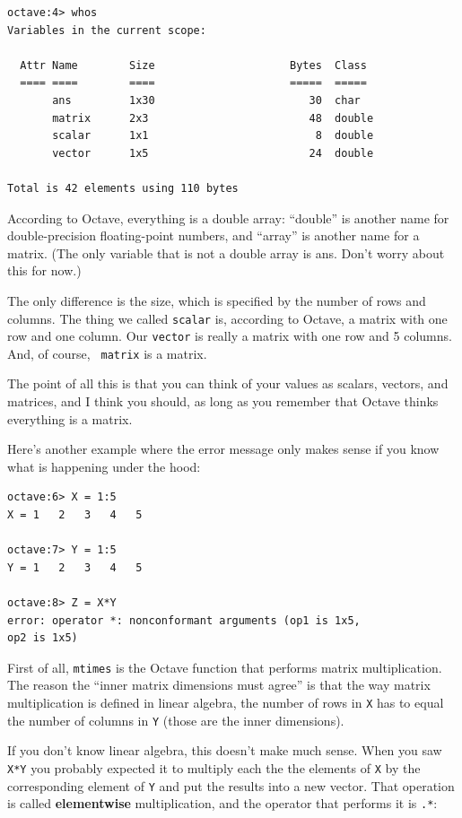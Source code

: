 \documentclass{book}
\begin{document}
\begin{verbatim}
octave:4> whos
Variables in the current scope:

  Attr Name        Size                     Bytes  Class
  ==== ====        ====                     =====  ===== 
       ans         1x30                        30  char
       matrix      2x3                         48  double
       scalar      1x1                          8  double
       vector      1x5                         24  double

Total is 42 elements using 110 bytes
\end{verbatim}

According to Octave, everything is a double array: ``double''
is another name for double-precision floating-point numbers,
and ``array'' is another name for a matrix. (The only variable that is not a
double array is ans. Don't worry about this for now.)

The only difference is the size, which is specified by the number of
rows and columns. The thing we called {\tt scalar} is, according to
Octave, a matrix with one row and one column. Our {\tt vector} is
really a matrix with one row and 5 columns. And, of course, {\tt
matrix} is a matrix.

The point of all this is that you can think of your values as
scalars, vectors, and matrices, and I think you should, as long
as you remember that Octave thinks everything is a matrix.

Here's another example where the error message only makes sense
if you know what is happening under the hood:

\begin{verbatim}
octave:6> X = 1:5
X = 1   2   3   4   5

octave:7> Y = 1:5
Y = 1   2   3   4   5

octave:8> Z = X*Y
error: operator *: nonconformant arguments (op1 is 1x5, 
op2 is 1x5)
\end{verbatim}

First of all, {\tt mtimes} is the Octave function that performs
matrix multiplication. The reason the ``inner matrix dimensions
must agree'' is that the way matrix multiplication is defined in
linear algebra, the number of rows in {\tt X} has to equal the
number of columns in {\tt Y} (those are the inner dimensions).

If you don't know linear algebra, this doesn't make much sense.
When you saw {\tt X*Y} you probably expected it to multiply each
the the elements of {\tt X} by the corresponding element of
{\tt Y} and put the results into a new vector. That operation
is called {\bf elementwise} multiplication, and the operator that
performs it is {\tt .*}:
\end{document}
